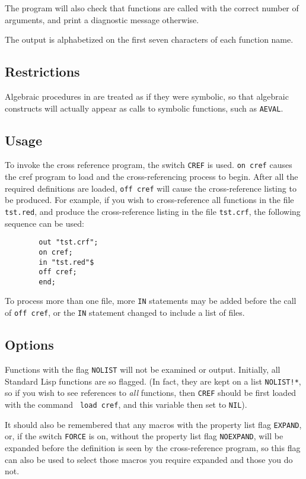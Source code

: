 The program will also check that functions are called with the correct
number of arguments, and print a diagnostic message otherwise.

The output is alphabetized on the first seven characters of each function
name.

\subsection{Restrictions}

Algebraic procedures in {\REDUCE} are treated as if they were symbolic, so
that algebraic constructs will actually appear as calls to symbolic
functions, such as {\tt AEVAL}.

\subsection{Usage}

To invoke the cross reference program, the switch {\tt CREF}
 is used. {\tt on cref} causes the cref program to load
and the cross-referencing process to begin.  After all the required
definitions are loaded, {\tt off cref} will cause the cross-reference
listing to be produced.  For example, if you wish to cross-reference all
functions in the file {\tt tst.red}, and produce the cross-reference
listing in the file {\tt tst.crf}, the following sequence can be used:
\begin{verbatim}
        out "tst.crf";
        on cref;
        in "tst.red"$
        off cref;
        end;
\end{verbatim}
To process more than one file, more {\tt IN} statements may be added
before the call of {\tt off cref}, or the {\tt IN} statement changed to
include a list of files.

\subsection{Options}

Functions with the flag {\tt NOLIST} will not be examined or output.
Initially, all Standard Lisp functions are so flagged. (In fact, they are
kept on a list {\tt NOLIST!*}, so if you wish to see references to {\em
all} functions, then {\tt CREF} should be first loaded with the command {\tt
load cref}, and this variable then set to {\tt NIL}).

It should also be remembered that any macros with the property list flag
{\tt EXPAND}, or, if the switch {\tt FORCE} is on, without the property
list flag {\tt NOEXPAND}, will be expanded before the definition is seen
by the cross-reference program, so this flag can also be used to select
those macros you require expanded and those you do not.

